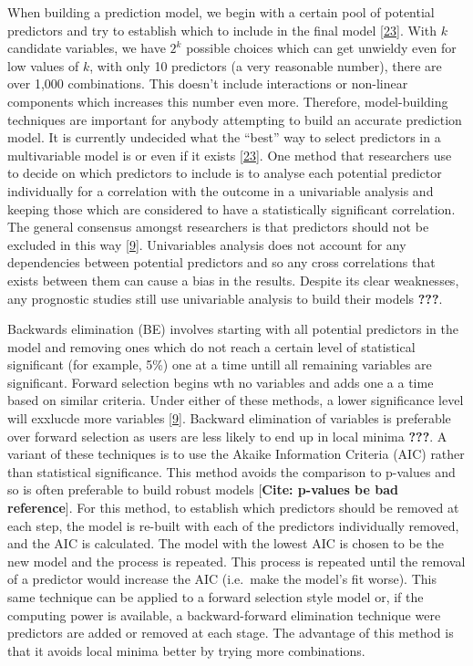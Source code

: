 \documentclass[12pt,PhD,twoside,openright]{muthesis}
\begin{document}
When building a prediction model, we begin with a certain pool of potential predictors and try to establish which to include in the final model {[}\protect\hyperlink{ref-sauerbrei_selection_2007}{23}{]}. With \(k\) candidate variables, we have \(2^k\) possible choices which can get unwieldy even for low values of \(k\), with only 10 predictors (a very reasonable number), there are over 1,000 combinations. This doesn't include interactions or non-linear components which increases this number even more. Therefore, model-building techniques are important for anybody attempting to build an accurate prediction model. It is currently undecided what the ``best'' way to select predictors in a multivariable model is or even if it exists {[}\protect\hyperlink{ref-sauerbrei_selection_2007}{23}{]}. One method that researchers use to decide on which predictors to include is to analyse each potential predictor individually for a correlation with the outcome in a univariable analysis and keeping those which are considered to have a statistically significant correlation. The general consensus amongst researchers is that predictors should not be excluded in this way {[}\protect\hyperlink{ref-royston_prognosis_2009}{9}{]}. Univariables analysis does not account for any dependencies between potential predictors and so any cross correlations that exists between them can cause a bias in the results. Despite its clear weaknesses, any prognostic studies still use univariable analysis to build their models {\textbf{???}}.

Backwards elimination (BE) involves starting with all potential predictors in the model and removing ones which do not reach a certain level of statistical significant (for example, 5\%) one at a time untill all remaining variables are significant. Forward selection begins wth no variables and adds one a a time based on similar criteria. Under either of these methods, a lower significance level will exxlucde more variables {[}\protect\hyperlink{ref-royston_prognosis_2009}{9}{]}. Backward elimination of variables is preferable over forward selection as users are less likely to end up in local minima {\textbf{???}}. A variant of these techniques is to use the Akaike Information Criteria (AIC) rather than statistical significance. This method avoids the comparison to p-values and so is often preferable to build robust models {[}\textbf{Cite: p-values be bad reference}{]}. For this method, to establish which predictors should be removed at each step, the model is re-built with each of the predictors individually removed, and the AIC is calculated. The model with the lowest AIC is chosen to be the new model and the process is repeated. This process is repeated until the removal of a predictor would increase the AIC (i.e.~make the model's fit worse). This same technique can be applied to a forward selection style model or, if the computing power is available, a backward-forward elimination technique were predictors are added or removed at each stage. The advantage of this method is that it avoids local minima better by trying more combinations.
\end{document}
